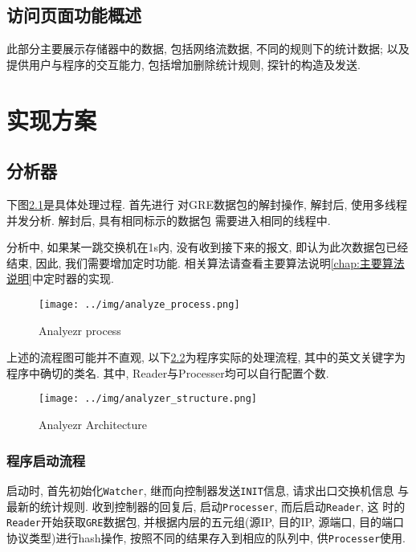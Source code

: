 \section{访问页面功能概述}

此部分主要展示存储器中的数据, 包括网络流数据, 不同的规则下的统计数据;
以及提供用户与程序的交互能力, 包括增加删除统计规则, 探针的构造及发送.


\chapter{实现方案}
\label{chap:实现方案}

\section{分析器}

下图\ref{fig:analyzer_process}是具体处理过程. 首先进行
对GRE数据包的解封操作, 解封后, 使用多线程并发分析. 解封后,
具有相同标示的数据包 需要进入相同的线程中.

分析中, 如果某一跳交换机在1s内, 没有收到接下来的报文,
即认为此次数据包已经结束, 因此, 我们需要增加定时功能.
相关算法请查看主要算法说明\ref{chap:主要算法说明}中定时器的实现.

\begin{figure}
  \centering
  \texttt{[image: ../img/analyze\_process.png]}
  \caption{Analyezr process}
  \label{fig:analyzer_process}
\end{figure}

上述的流程图可能并不直观, 以下\ref{fig:analyzer_arch}为程序实际的处理流程,
其中的英文关键字为程序中确切的类名. 其中,
Reader与Processer均可以自行配置个数.

\begin{figure}
  \centering
  \texttt{[image: ../img/analyzer\_structure.png]}
  \caption{Analyezr Architecture}
  \label{fig:analyzer_arch}
\end{figure}

\subsection{程序启动流程}

启动时, 首先初始化\texttt{Watcher}, 继而向控制器发送\texttt{INIT}信息,
请求出口交换机信息 与最新的统计规则. 收到控制器的回复后,
启动\texttt{Processer}, 而后启动\texttt{Reader}, 这
时的\texttt{Reader}开始获取\texttt{GRE}数据包, 并根据内层的五元组(源IP,
目的IP, 源端口, 目的端口 协议类型)进行hash操作,
按照不同的结果存入到相应的队列中, 供\texttt{Processer}使用.

